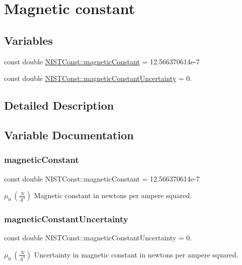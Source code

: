 \hypertarget{group___magnetic_constant}{}\section{Magnetic constant}
\label{group___magnetic_constant}
\subsection*{Variables}
\begin{DoxyCompactItemize}
\item 
const double \hyperlink{group___magnetic_constant_ga511860d1f2830ae6a85e1b1df8522071}{N\+I\+S\+T\+Const\+::magnetic\+Constant} = 12.\+566370614e-\/7
\item 
const double \hyperlink{group___magnetic_constant_ga17f91f2aa414afe44a0bc84825034a4e}{N\+I\+S\+T\+Const\+::magnetic\+Constant\+Uncertainty} = 0.
\end{DoxyCompactItemize}


\subsection{Detailed Description}


\subsection{Variable Documentation}
\mbox{\label{group___magnetic_constant_ga511860d1f2830ae6a85e1b1df8522071}} 
\subsubsection{\texorpdfstring{magnetic\+Constant}{magneticConstant}}
{\footnotesize\ttfamily const double N\+I\+S\+T\+Const\+::magnetic\+Constant = 12.\+566370614e-\/7}

$\mu_0 \ (\frac{N}{A^3})$ Magnetic constant in newtons per ampere squared. \mbox{\label{group___magnetic_constant_ga17f91f2aa414afe44a0bc84825034a4e}} 
\subsubsection{\texorpdfstring{magnetic\+Constant\+Uncertainty}{magneticConstantUncertainty}}
{\footnotesize\ttfamily const double N\+I\+S\+T\+Const\+::magnetic\+Constant\+Uncertainty = 0.}

$\mu_0 \ (\frac{N}{A^3})$ Uncertainty in magnetic constant in newtons per ampere squared. 